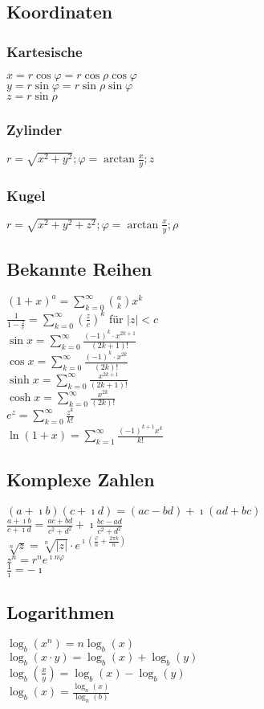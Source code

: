     \subsection{Koordinaten}
        \subsubsection{Kartesische}
            $x = r\cos\varphi = r\cos\rho\cos\varphi$ \\
            $y = r\sin\varphi = r\sin\rho\sin\varphi$ \\
            $z = r\sin\rho$
        \subsubsection{Zylinder}
            $r=\sqrt{x^2+y^2}; \varphi = \arctan{\frac{x}{y}}; z$
        \subsubsection{Kugel}
            $r=\sqrt{x^2+y^2+z^2}; \varphi = \arctan{\frac{x}{y}}; \rho$
    \subsection{Bekannte Reihen}
        $\displaystyle (1+x)^a = \sum_{k=0}^{\infty}\binom{a}{k}x^k$ \\
        $\displaystyle \frac{1}{1-\frac{z}{c}} = \sum_{k=0}^{\infty}\left(\frac{z}{c}\right)^k$ für $|z| < c$ \\
        $\displaystyle \sin{x} = \sum_{k=0}^{\infty}\frac{(-1)^k\cdot x^{2k+1}}{(2k+1)!}$ \\
        $\displaystyle \cos{x} = \sum_{k=0}^{\infty}\frac{(-1)^k\cdot x^{2k}}{(2k)!}$ \\
        $\displaystyle \sinh{x} = \sum_{k=0}^{\infty}\frac{x^{2k+1}}{(2k+1)!}$ \\
        $\displaystyle \cosh{x} = \sum_{k=0}^{\infty}\frac{x^{2k}}{(2k)!}$ \\
        $\displaystyle e^z = \sum_{k=0}^{\infty}\frac{z^k}{k!}$ \\
        $\displaystyle \ln(1+x) = \sum_{k=1}^{\infty}\frac{(-1)^{k+1}x^k}{k!}$
    \subsection{Komplexe Zahlen}
        $(a+\imath b)(c+\imath d)=(ac-bd)+\imath(ad+bc)$ \\
        $\displaystyle\frac{a+\imath b}{c+\imath d}=\frac{ac+bd}{c^2+d^2}+\imath\frac{bc-ad}{c^2+d^2}$ \\
        $\displaystyle \sqrt[n]{z}=\sqrt[n]{|z|}\cdot e^{\imath\left(\frac{\varphi}{n}+\frac{2\pi k}{n}\right)}$ \\
        $z^n=r^ne^{\imath n\varphi}$ \\
        $\frac{1}{\imath} = -\imath$
    \subsection{Logarithmen}
        $\log_b(x^n) = n\log_b(x)$ \\
        $\log_b(x\cdot y) = \log_b(x) + \log_b(y)$ \\
        $\log_b(\frac{x}{y}) = \log_b(x) - \log_b(y)$ \\
        $\log_b(x) = \frac{\log_n(x)}{\log_n(b)}$ 
